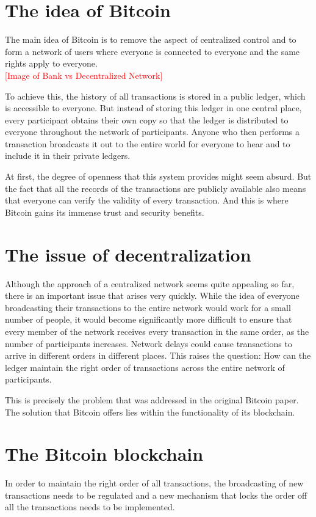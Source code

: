\documentclass[a4paper, 12pt]{report}
\begin{document}
\section{The idea of Bitcoin}
\par The main idea of Bitcoin is to remove the aspect of centralized control and to form a network of users where everyone is connected to everyone and the same rights apply to everyone.  
\\ \textcolor{red}{[Image of Bank vs Decentralized Network]} \\
\par To achieve this, the history of all transactions is stored in a public ledger, which is accessible to everyone. But instead of storing this ledger in one central place, every participant obtains their own copy so that the ledger is distributed to everyone throughout the network of participants. Anyone who then performs a transaction broadcasts it out to the entire world for everyone to hear and to include it in their private ledgers. 
\par At first, the degree of openness that this system provides might seem absurd. But the fact that all the records of the transactions are publicly available also means that everyone can verify the validity of every transaction. And this is where Bitcoin gains its immense trust and security benefits.

\section{The issue of decentralization}
\par Although the approach of a centralized network seems quite appealing so far, there is an important issue that arises very quickly. While the idea of everyone broadcasting their transactions to the entire network would work for a small number of people, it would become significantly more difficult to ensure that every member of the network receives every transaction in the same order, as the number of participants increases. Network delays could cause transactions to arrive in different orders in different places. This raises the question: How can the ledger maintain the right order of transactions across the entire network of participants. 
\par This is precisely the problem that was addressed in the original Bitcoin paper. The solution that Bitcoin offers lies within the functionality of its blockchain.

\section{The Bitcoin blockchain}
\par In order to maintain the right order of all transactions, the broadcasting of new transactions needs to be regulated and a new mechanism that locks the order off all the transactions needs to be implemented.
\end{document}

